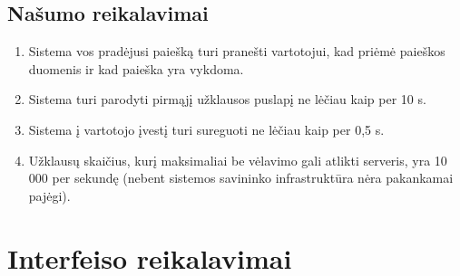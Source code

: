 \documentclass[12pt]{article}
\renewcommand{\thesubsection}{FR\arabic{subsection}}
\renewcommand*{\theenumi}{\thesubsection.\arabic{enumi}}
\renewcommand*{\theenumii}{\thesubsubsection.\theenumi.\arabic{enumii}}
\begin{document}
	\subsection{Našumo reikalavimai}
	\begin{enumerate}[labelindent=10pt,leftmargin=2.2cm]
		\item Sistema vos pradėjusi paiešką turi pranešti vartotojui, kad priėmė paieškos duomenis ir kad paieška yra vykdoma.
		\item Sistema turi parodyti pirmąjį užklausos puslapį ne lėčiau kaip per 10 s.
		\item Sistema į vartotojo įvestį turi sureguoti ne lėčiau kaip per 0,5 s.
		\item Užklausų skaičius, kurį maksimaliai be vėlavimo gali atlikti serveris, yra 10 000 per sekundę (nebent sistemos savininko infrastruktūra nėra pakankamai pajėgi).
	\end{enumerate}
	
	\pagebreak
	\renewcommand{\thesubsection}{IR\arabic{subsection}}
	\section*{Interfeiso reikalavimai}	
	\setcounter{subsection}{0}	
\end{document}
